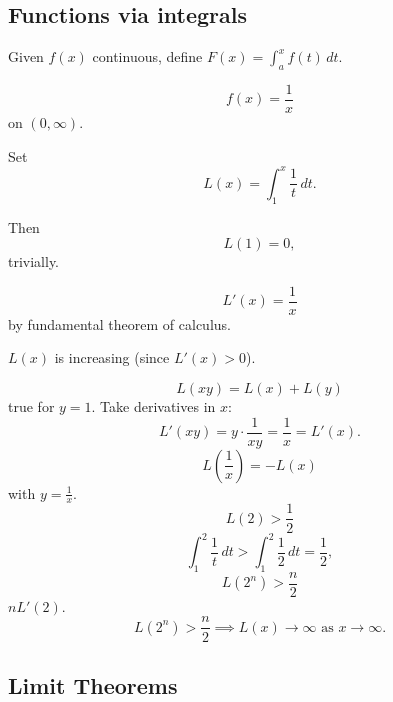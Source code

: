 \documentclass[10pt, a4paper]{article}
\begin{document}
\subsection{Functions via integrals}
Given $f(x)$ continuous,
define $F(x) = \int_{a}^{x}f(t)\,dt$.

\begin{example}
    \[
    f(x) = \frac{1}{x}
    \]
    on $(0, \infty)$.

    Set
    \[
    L(x) = \int_{1}^{x}\frac{1}{t}\,dt.
    \]

    Then
    \[
    L(1) = 0,
    \]
    trivially.
    
    \[
    L'(x) = \frac{1}{x}
    \]
    by fundamental theorem of calculus.

    $L(x)$ is increasing
    (since $L'(x) > 0$).

    \[
    L(xy) = L(x) + L(y)
    \]
    true for $y = 1$.
    Take derivatives in $x$:
    \[
    L'(xy) = y \cdot \frac{1}{xy} = \frac{1}{x} = L'(x).
    \]
    \[
    L\left(\frac{1}{x}\right) = -L(x)
    \]
    with $y = \frac{1}{x}$.
    \[
    L(2) > \frac{1}{2}
    \]
    \[
    \int_{1}^{2}\frac{1}{t}\,dt > \int_{1}^{2}\frac{1}{2}\,dt = \frac{1}{2},
    \]
    \[
    L(2 ^ n) > \frac{n}{2}
    \]
    $nL'(2)$.
    \[
    L(2 ^ n) > \frac{n}{2} \implies L(x) \to \infty \text{ as } x \to \infty.
    \]
\end{example}

\subsection{Limit Theorems}
\end{document}
